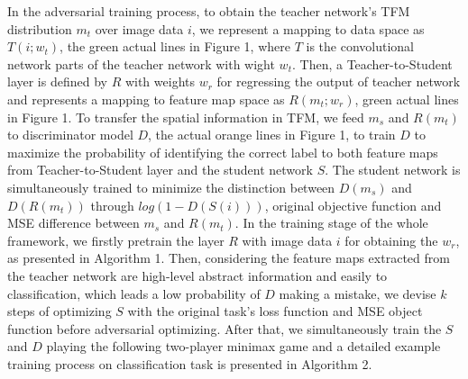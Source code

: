 \documentclass[letterpaper]{article} %
\begin{document}
In the adversarial training process, to obtain the teacher network's TFM distribution $m_{t}$ over image data $i$, we represent a mapping to data space as $T({i};w_{t})$, the green actual lines in Figure 1, where $T$ is the convolutional network parts of the teacher network with wight $w_{t}$.
Then, a Teacher-to-Student layer is defined by $R$ with weights $w_{r}$ for regressing the output of teacher network and represents a mapping to feature map space as $R(m_{t};w_{r})$, green actual lines in Figure 1.
To transfer the spatial information in TFM, we feed $m_{s}$ and $R(m_{t})$ to discriminator model $D$, the actual orange lines in Figure 1, to train $D$ to maximize the probability of identifying the correct label to both feature maps from Teacher-to-Student layer and the student network $S$.
The student network is simultaneously trained to minimize the distinction between $D(m_{s})$ and $D(R(m_{t}))$ through $log(1-D(S({i})))$, original objective function and MSE difference between $m_{s}$ and $R(m_{t})$.
In the training stage of the whole framework, we firstly pretrain the layer $R$ with image data $i$ for obtaining the $w_{r}$, as presented in Algorithm 1. Then, considering the feature maps extracted from the teacher network are high-level abstract information and easily to classification, which leads a low probability of $D$ making a mistake, we devise $k$ steps of optimizing $S$ with the original task's loss function and MSE object function before adversarial optimizing. After that, we simultaneously train the $S$ and $D$ playing the following two-player minimax game and a detailed example training process on classification task is presented in Algorithm 2.
\end{document}
